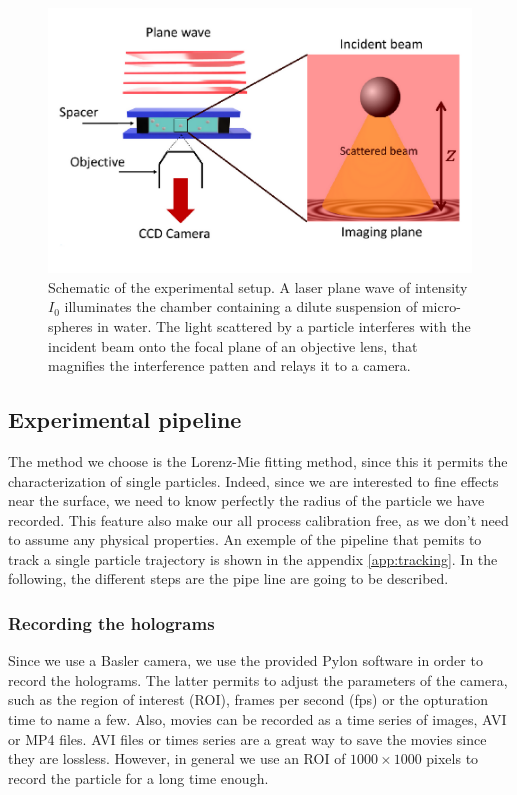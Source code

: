 \begin{figure}[!ht]
	\centering
	\includegraphics[scale=0.9]{02_body/chapter2/images/figures_setup/schema_setup.pdf}
	\caption{Schematic of the experimental setup. A laser plane wave of intensity $I_0$ illuminates the chamber containing a dilute suspension of micro-spheres in water. The light scattered by a particle interferes with the incident beam onto the focal plane of an objective lens, that magnifies the interference patten and relays it to a camera.}
	\label{fig:schema}
\end{figure}




\subsection{Experimental pipeline}
The method we choose is the Lorenz-Mie fitting method, since this it permits the characterization of single particles. Indeed, since we are interested to fine effects near the surface, we need to know perfectly the radius of the particle we have recorded. This feature also make our all process calibration free, as we don't need to assume any physical properties. An exemple of the pipeline that pemits to track a single particle trajectory is shown in the appendix \ref{app:tracking}. In the following, the different steps are the pipe line are going to be described.

\subsubsection{Recording the holograms}
Since we use a Basler camera, we use the provided Pylon software in order to record the holograms. The latter permits to adjust the parameters of the camera, such as the region of interest (\gls{ROI}), frames per second (\gls{fps}) or the opturation time to name a few. Also, movies can be recorded as a time series of images, AVI or MP4 files. AVI files or times series are a great way to save the movies since they are lossless. However, in general we use an \gls{ROI} of $1000 \times 1000$ pixels to record the particle for a long time enough. 

